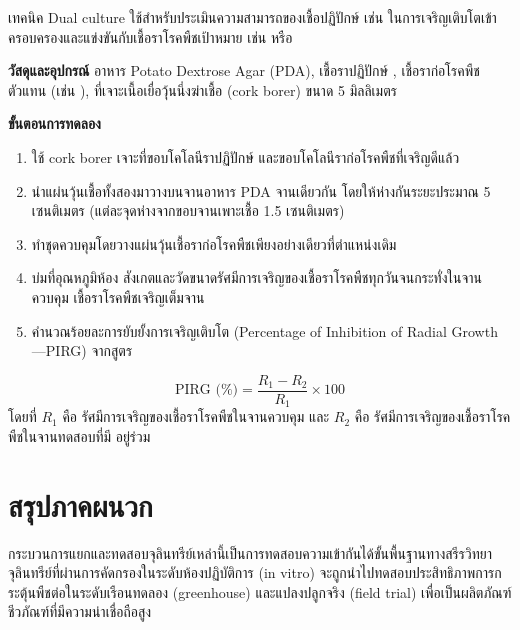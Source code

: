 เทคนิค Dual culture ใช้สำหรับประเมินความสามารถของเชื้อปฏิปักษ์ เช่น  ในการเจริญเติบโตเข้าครอบครองและแข่งขันกับเชื้อราโรคพืชเป้าหมาย เช่น  หรือ 

\begin{labprotocol}
\textbf{วัสดุและอุปกรณ์} อาหาร Potato Dextrose Agar (PDA), เชื้อราปฏิปักษ์ , เชื้อราก่อโรคพืชตัวแทน (เช่น ), ที่เจาะเนื้อเยื่อวุ้นนึ่งฆ่าเชื้อ (cork borer) ขนาด 5 มิลลิเมตร

\textbf{ขั้นตอนการทดลอง}
\begin{enumerate}
    \item ใช้ cork borer เจาะที่ขอบโคโลนีราปฏิปักษ์ และขอบโคโลนีราก่อโรคพืชที่เจริญดีแล้ว
    \item นำแผ่นวุ้นเชื้อทั้งสองมาวางบนจานอาหาร PDA จานเดียวกัน โดยให้ห่างกันระยะประมาณ 5 เซนติเมตร (แต่ละจุดห่างจากขอบจานเพาะเชื้อ 1.5 เซนติเมตร)
    \item ทำชุดควบคุมโดยวางแผ่นวุ้นเชื้อราก่อโรคพืชเพียงอย่างเดียวที่ตำแหน่งเดิม
    \item บ่มที่อุณหภูมิห้อง สังเกตและวัดขนาดรัศมีการเจริญของเชื้อราโรคพืชทุกวันจนกระทั่งในจานควบคุม เชื้อราโรคพืชเจริญเต็มจาน
    \item คำนวณร้อยละการยับยั้งการเจริญเติบโต (Percentage of Inhibition of Radial Growth —PIRG) จากสูตร
\end{enumerate}

\begin{equation}
\text{PIRG (\%)} = \frac{R_1 - R_2}{R_1} \times 100
\end{equation}
โดยที่ $R_1$ คือ รัศมีการเจริญของเชื้อราโรคพืชในจานควบคุม และ $R_2$ คือ รัศมีการเจริญของเชื้อราโรคพืชในจานทดสอบที่มี  อยู่ร่วม
\end{labprotocol}

\section*{สรุปภาคผนวก}

กระบวนการแยกและทดสอบจุลินทรีย์เหล่านี้เป็นการทดสอบความเข้ากันได้ขั้นพื้นฐานทางสรีรวิทยา จุลินทรีย์ที่ผ่านการคัดกรองในระดับห้องปฏิบัติการ (in vitro) จะถูกนำไปทดสอบประสิทธิภาพการกระตุ้นพืชต่อในระดับเรือนทดลอง (greenhouse) และแปลงปลูกจริง (field trial) เพื่อเป็นผลิตภัณฑ์ชีวภัณฑ์ที่มีความน่าเชื่อถือสูง
